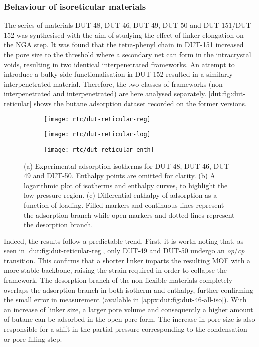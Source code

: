 \subsubsection{Behaviour of isoreticular materials}

The series of materials DUT-48, DUT-46, DUT-49, DUT-50 and DUT-151/DUT-152
was synthesised with the aim of studying the effect of linker 
elongation on the \gls{NGA} step. It was found that the tetra-phenyl chain
in DUT-151 increased the pore size to the threshold 
where a secondary net can form in the intracrystal voids, resulting 
in two identical interpenetrated frameworks. An attempt to introduce 
a bulky side-functionalisation in DUT-152 resulted in a similarly
interpenetrated material. Therefore, the two classes of frameworks 
(non-interpenetrated and interpenetrated) are here analysed separately.
\autoref{dut:fig:dut-reticular} shows the butane adsorption dataset
recorded on the former versions.

\begin{figure}[htb]
    \centering
    \begin{subfigure}{0.33\linewidth}
        \texttt{[image: rtc/dut-reticular-reg]}%
        \caption{}\label{dut:fig:dut-reticular-reg}
    \end{subfigure}%
    \begin{subfigure}{0.33\linewidth}
        \texttt{[image: rtc/dut-reticular-log]}%
        \caption{}\label{dut:fig:dut-reticular-log}
    \end{subfigure}%
    \begin{subfigure}{0.33\linewidth}
        \texttt{[image: rtc/dut-reticular-enth]}%
        \caption{}\label{dut:fig:dut-reticular-enth}
    \end{subfigure}%
    \caption{(a) Experimental adsorption isotherms for DUT-48, DUT-46, DUT-49 and 
    DUT-50. Enthalpy points are omitted for clarity. (b) A logarithmic plot of 
    isotherms and enthalpy curves, to highlight the low pressure region. 
    (c) Differential enthalpy of adsorption as a function of loading.
    Filled markers and continuous lines represent the adsorption 
    branch while open markers and dotted lines represent the 
    desorption branch.
    }\label{dut:fig:dut-reticular}
\end{figure}


Indeed, the results follow a predictable trend. First, it is worth 
noting that, as seen in \autoref{dut:fig:dut-reticular-reg}, only DUT-49 
and DUT-50 undergo an \textit{op}/\textit{cp} transition. This confirms that 
a shorter linker imparts the resulting \gls{MOF} with a more stable backbone,
raising the strain required in order to collapse the framework.
The desorption branch of the non-flexible materials completely 
overlaps the adsorption branch in both isotherm and enthalpy, further
confirming the small error in measurement (available in 
\autoref{appx:dut:fig:dut-46-all-iso}).
With an increase of linker size, a larger pore volume and consequently
a higher amount of butane can be adsorbed in the open pore form. 
The increase in pore size is also responsible for a shift in the 
partial pressure corresponding to the condensation or pore filling step.

